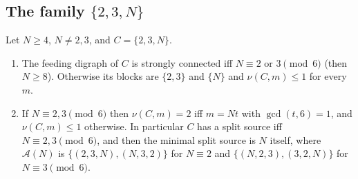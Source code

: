 \subsection{The family \texorpdfstring{$\{2,3,N\}$}{{2,3,N}}}
\begin{theorem}\label{thm:23N}
Let $N\ge4$, $N\ne2,3$, and $C=\{2,3,N\}$.
\begin{enumerate}[label=(\alph*),itemsep=1pt]
\item The feeding digraph of $C$ is strongly connected iff $N\equiv2$ or $3\pmod 6$ (then $N\ge8$). Otherwise its blocks are $\{2,3\}$ and $\{N\}$ and $\nu(C,m)\le1$ for every $m$.
\item If $N\equiv2,3\pmod6$ then $\nu(C,m)=2$ iff $m=Nt$ with $\gcd(t,6)=1$, and $\nu(C,m)\le1$ otherwise. In particular $C$ has a split source iff $N\equiv2,3\pmod6$, and then the minimal split source is $N$ itself, where $\mathcal A(N)$ is $\{(2,3,N),(N,3,2)\}$ for $N\equiv2$ and $\{(N,2,3),(3,2,N)\}$ for $N\equiv3\pmod 6$.
\end{enumerate}
\end{theorem}
